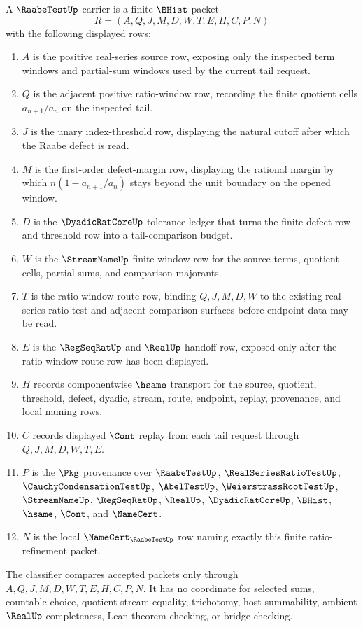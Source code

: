 \begin{definition}
\label{def:raabe-test-carrier}
A $\RaabeTestUp$ carrier is a finite $\BHist$ packet
$$
R=(A,Q,J,M,D,W,T,E,H,C,P,N)
$$
with the following displayed rows:
\begin{enumerate}
\item $A$ is the positive real-series source row, exposing only the inspected term windows and partial-sum windows used by the current tail request.
\item $Q$ is the adjacent positive ratio-window row, recording the finite quotient cells $a_{n+1}/a_n$ on the inspected tail.
\item $J$ is the unary index-threshold row, displaying the natural cutoff after which the Raabe defect is read.
\item $M$ is the first-order defect-margin row, displaying the rational margin by which $n(1-a_{n+1}/a_n)$ stays beyond the unit boundary on the opened window.
\item $D$ is the $\DyadicRatCoreUp$ tolerance ledger that turns the finite defect row and threshold row into a tail-comparison budget.
\item $W$ is the $\StreamNameUp$ finite-window row for the source terms, quotient cells, partial sums, and comparison majorants.
\item $T$ is the ratio-window route row, binding $Q,J,M,D,W$ to the existing real-series ratio-test and adjacent comparison surfaces before endpoint data may be read.
\item $E$ is the $\RegSeqRatUp$ and $\RealUp$ handoff row, exposed only after the ratio-window route row has been displayed.
\item $H$ records componentwise $\hsame$ transport for the source, quotient, threshold, defect, dyadic, stream, route, endpoint, replay, provenance, and local naming rows.
\item $C$ records displayed $\Cont$ replay from each tail request through $Q,J,M,D,W,T,E$.
\item $P$ is the $\Pkg$ provenance over $\RaabeTestUp$, $\RealSeriesRatioTestUp$, $\CauchyCondensationTestUp$, $\AbelTestUp$, $\WeierstrassRootTestUp$, $\StreamNameUp$, $\RegSeqRatUp$, $\RealUp$, $\DyadicRatCoreUp$, $\BHist$, $\hsame$, $\Cont$, and $\NameCert$.
\item $N$ is the local $\NameCert_{\RaabeTestUp}$ row naming exactly this finite ratio-refinement packet.
\end{enumerate}
The classifier compares accepted packets only through $A,Q,J,M,D,W,T,E,H,C,P,N$. It has no coordinate for selected sums, countable choice, quotient stream equality, trichotomy, host summability, ambient $\RealUp$ completeness, Lean theorem checking, or bridge checking.
\end{definition}

